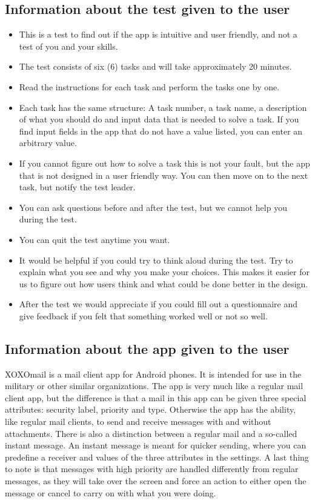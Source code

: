 		\subsection{Information about the test given to the user}
			\begin{itemize}
				\item{}This is a test to find out if the app is intuitive and user friendly, and not a test of you and your skills.
				\item{}The test consists of six (6) tasks and will take approximately 20 minutes.
				\item{}Read the instructions for each task and perform the tasks one by one.
				\item{}Each task has the same structure: A task number, a task name, a description of what you should do and input data that is needed to solve a task. If you find input fields in the app that do not have a value listed, you can enter an arbitrary value.
				\item{}If you cannot figure out how to solve a task this is not your fault, but the app that is not designed in a user friendly way. You can then move on to the next task, but notify the test leader.
				\item{}You can ask questions before and after the test, but we cannot help you during the test.
				\item{}You can quit the test anytime you want.
				\item{}It would be helpful if you could try to think aloud during the test. Try to explain what you see and why you make your choices. This makes it easier for us to figure out how users think and what could be done better in the design.
				\item{}After the test we would appreciate if you could fill out a questionnaire and give feedback if you felt that something worked well or not so well.
			\end{itemize}
\subsection{Information about the app given to the user}
			XOXOmail is a mail client app for Android phones. It is intended for use in the military or other similar organizations. The app is very much like a regular mail client app, but the difference is that a mail in this app can be given three special  attributes: security label, priority and type. Otherwise the app has the ability, like regular mail clients, to send and receive messages with and without attachments. 
			\newline
			\newline
			There is also a distinction between a regular mail and a so-called instant message. An instant message is meant for quicker sending, where you can predefine a receiver and values of the three attributes in the settings.  A last thing to note is that messages with high priority are handled differently from regular messages, as they will take over the screen and force an action to either open the message or cancel to carry on with what you were doing.
